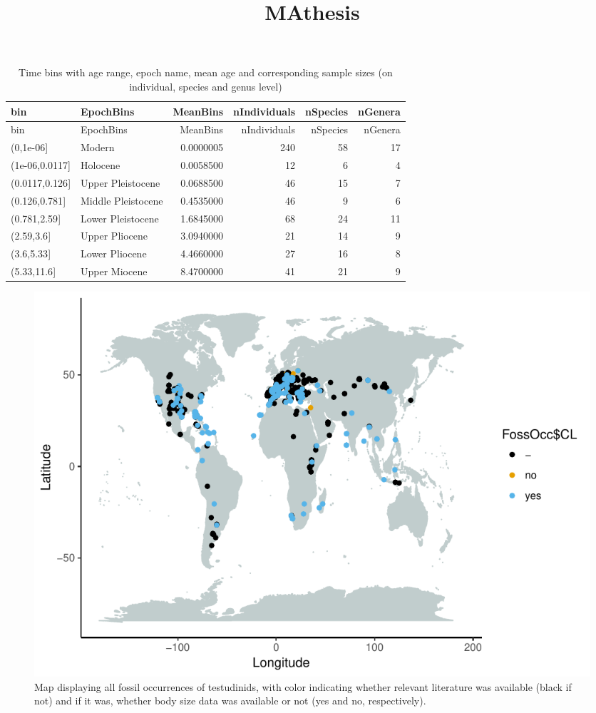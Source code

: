 \documentclass[]{article}
\title{MAthesis}
\author{}
\date{}
\begin{document}
\maketitle

\begin{longtable}[]{@{}llrrrr@{}}
\caption{Time bins with age range, epoch name, mean age and
corresponding sample sizes (on individual, species and genus
level)}\tabularnewline
\toprule
bin & EpochBins & MeanBins & nIndividuals & nSpecies &
nGenera\tabularnewline
\midrule
\endfirsthead
\toprule
bin & EpochBins & MeanBins & nIndividuals & nSpecies &
nGenera\tabularnewline
\midrule
\endhead
(0,1e-06{]} & Modern & 0.0000005 & 240 & 58 & 17\tabularnewline
(1e-06,0.0117{]} & Holocene & 0.0058500 & 12 & 6 & 4\tabularnewline
(0.0117,0.126{]} & Upper Pleistocene & 0.0688500 & 46 & 15 &
7\tabularnewline
(0.126,0.781{]} & Middle Pleistocene & 0.4535000 & 46 & 9 &
6\tabularnewline
(0.781,2.59{]} & Lower Pleistocene & 1.6845000 & 68 & 24 &
11\tabularnewline
(2.59,3.6{]} & Upper Pliocene & 3.0940000 & 21 & 14 & 9\tabularnewline
(3.6,5.33{]} & Lower Pliocene & 4.4660000 & 27 & 16 & 8\tabularnewline
(5.33,11.6{]} & Upper Miocene & 8.4700000 & 41 & 21 & 9\tabularnewline
\bottomrule
\end{longtable}

\begin{figure}[htbp]
\centering
\includegraphics{MA_JJ_files/figure-latex/Map fossil occurrences-1.pdf}
\caption{Map displaying all fossil occurrences of testudinids, with
color indicating whether relevant literature was available (black if
not) and if it was, whether body size data was available or not (yes and
no, respectively).}
\end{figure}
\end{document}

